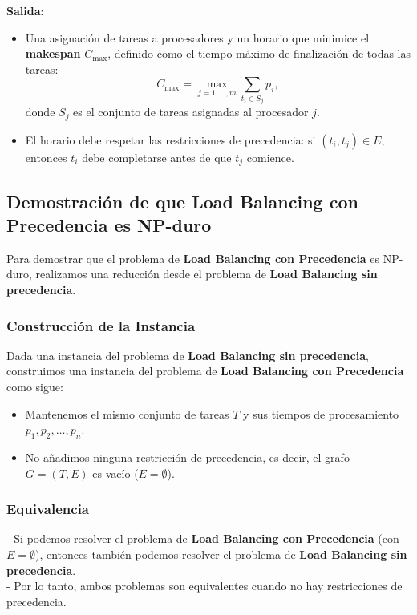 \documentclass{report}
\begin{document}
	\textbf{Salida}:
	\begin{itemize}
		\item Una asignación de tareas a procesadores y un horario que minimice el \textbf{makespan} $ C_{\text{max}} $, definido como el tiempo máximo de finalización de todas las tareas:
		\[
		C_{\text{max}} = \max_{j=1, \dots, m} \sum_{t_i \in S_j} p_i,
		\]
		donde $ S_j $ es el conjunto de tareas asignadas al procesador $ j $.
		\item El horario debe respetar las restricciones de precedencia: si $ (t_i, t_j) \in E $, entonces $ t_i $ debe completarse antes de que $ t_j $ comience.
	\end{itemize}
	
	\subsection{Demostración de que Load Balancing con Precedencia es NP-duro}
	
	Para demostrar que el problema de \textbf{Load Balancing con Precedencia} es NP-duro, realizamos una reducción desde el problema de \textbf{Load Balancing sin precedencia}.
	
	\subsubsection*{Construcción de la Instancia}
	
	Dada una instancia del problema de \textbf{Load Balancing sin precedencia}, construimos una instancia del problema de \textbf{Load Balancing con Precedencia} como sigue:
	\begin{itemize}
		\item Mantenemos el mismo conjunto de tareas $ T $ y sus tiempos de procesamiento $ p_1, p_2, \dots, p_n $.
		\item No añadimos ninguna restricción de precedencia, es decir, el grafo $ G = (T, E) $ es vacío ($ E = \emptyset $).
	\end{itemize}
	
	\subsubsection*{Equivalencia}
	
	- Si podemos resolver el problema de \textbf{Load Balancing con Precedencia} (con $ E = \emptyset $), entonces también podemos resolver el problema de \textbf{Load Balancing sin precedencia}.\\
	- Por lo tanto, ambos problemas son equivalentes cuando no hay restricciones de precedencia.
	
\end{document}
